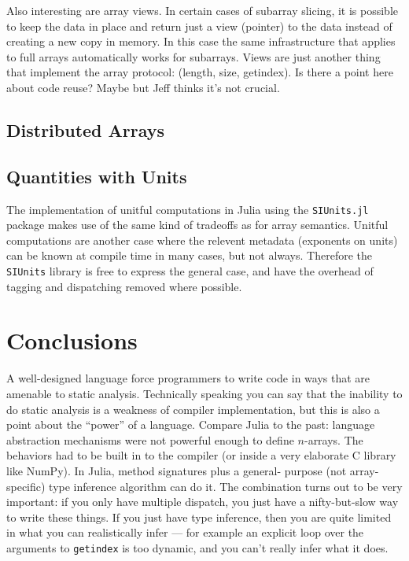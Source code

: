 \documentclass[preprint]{sigplanconf}
\newcommand{\code}[1]{\texttt{#1}}
\begin{document}
Also interesting are array views. In certain cases of subarray slicing, it is
possible to keep the data in place and return just a view (pointer) to the
data instead of creating a new copy in memory. In this case the same
infrastructure that applies to full arrays automatically works for subarrays.
Views are just another thing that implement the array protocol: (length, size,
getindex). Is there a point here about code reuse? Maybe but Jeff thinks it's
not crucial.

\subsection{Distributed Arrays}

\subsection{Quantities with Units}

The implementation of unitful computations in Julia using the
\code{SIUnits.jl}\cite{Fischer:2014si} package makes use of the same kind of
tradeoffs as for array semantics. Unitful computations are another case
where the relevent metadata (exponents on units) can be
known at compile time in many cases, but not always. Therefore the
\code{SIUnits} library is free to express the general case, and have the
overhead of tagging and dispatching removed where possible.



\section{Conclusions}

A well-designed language force programmers to write code in ways that are
amenable to static analysis. Technically speaking you can say that the
inability to do static analysis is a weakness of compiler implementation, but
this is also a point about the ``power'' of a language. Compare Julia to the
past: language abstraction mechanisms were not powerful enough to define
$n$-arrays. The behaviors had to be built in to the compiler (or inside a very
elaborate C library like NumPy). In Julia, method signatures plus a general-
purpose (not array-specific) type inference algorithm can do it. The
combination turns out to be very important: if you only have multiple
dispatch, you just have a nifty-but-slow way to write these things. If you
just have type inference, then you are quite limited in what you can
realistically infer --- for example an explicit loop over the arguments to
\code{getindex} is too dynamic, and you can't really infer what it does.
\end{document}
